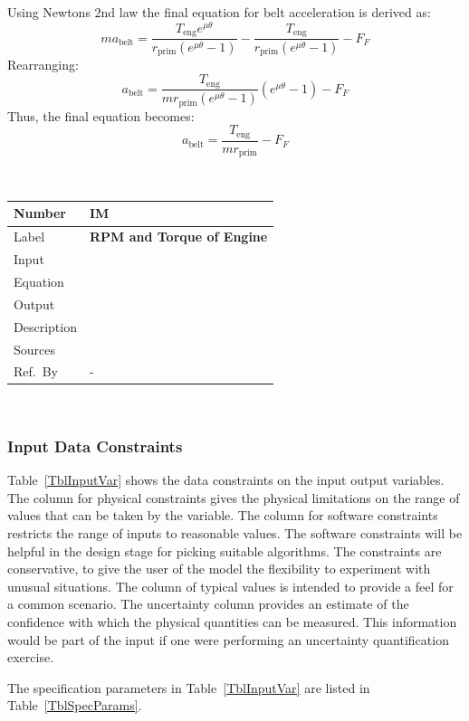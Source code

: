 \documentclass[12pt]{article}
\newcommand{\colAwidth}{0.13\textwidth}
\newcommand{\colBwidth}{0.82\textwidth}
\newcounter{instnum} %
\newcommand{\definstance}[7] {
~\newline
\noindent
\begin{minipage}{\textwidth}
\renewcommand*{\arraystretch}{1.5}
\begin{tabular}{| p{\colAwidth} | p{\colBwidth}|}
  \hline
  \rowcolor[gray]{0.9}
  Number& IM\refstepcounter{instnum}\theinstnum \label{inst:\theinstnum}\\
  \hline
  Label& \bf #1 \\
  \hline
  Input& #2\\
  \hline
  Equation& #3\\
  \hline
  Output& #4\\
  \hline
  Description& #5 \\
  \hline
  Sources& #6 \\
  \hline
  Ref.\ By & #7\\
  \hline
\end{tabular}
\end{minipage}\\
}
\begin{document}
Using Newtons 2nd law the final equation for belt acceleration is derived as: \\
\[m a_{\text{belt}} = \frac{T_{\text{eng}} e^{\mu \theta}}{r_{\text{prim}} (e^{\mu \theta} - 1)} - \frac{T_{\text{eng}}}{r_{\text{prim}} (e^{\mu \theta} - 1)} - F_F\]
Rearranging: \\
\[a_{\text{belt}} = \frac{T_{\text{eng}}}{m r_{\text{prim}} (e^{\mu \theta} - 1)} (e^{\mu \theta} - 1) - F_F\]
Thus, the final equation becomes: \\
\[a_{\text{belt}} = \frac{T_{\text{eng}}}{m r_{\text{prim}}} - F_F\]



\definstance
{RPM and Torque of Engine}
{} %
{} %
{} %
{} %
{} %
{-}

\subsubsection{Input Data Constraints} \label{sec_DataConstraints}    

Table~\ref{TblInputVar} shows the data constraints on the input output
variables.  The column for physical constraints gives the physical limitations
on the range of values that can be taken by the variable.  The column for
software constraints restricts the range of inputs to reasonable values.  The
software constraints will be helpful in the design stage for picking suitable
algorithms.  The constraints are conservative, to give the user of the model the
flexibility to experiment with unusual situations.  The column of typical values
is intended to provide a feel for a common scenario.  The uncertainty column
provides an estimate of the confidence with which the physical quantities can be
measured.  This information would be part of the input if one were performing an
uncertainty quantification exercise.

The specification parameters in Table~\ref{TblInputVar} are listed in
Table~\ref{TblSpecParams}.
\end{document}
